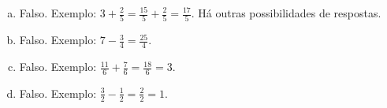 \begin{solucao}{}{}

\begin{enumerate} [a)] %
    \item       Falso. Exemplo: $3 + \frac{2}{5} = \frac{15}{5}+\frac{2}{5} = \frac{17}{5}$.  Há outras possibilidades de respostas.
    \item       Falso. Exemplo:       $7 - \frac{3}{4} = \frac{25}{4}$.
    \item       Falso. Exemplo:       $\frac{11}{6} + \frac{7}{6} = \frac{18}{6} = 3$.
    \item       Falso. Exemplo:       $\frac{3}{2} - \frac{1}{2} = \frac{2}{2} = 1$.
\end{enumerate} %


\end{solucao}

